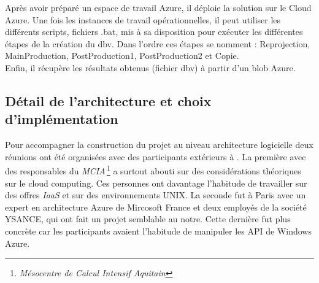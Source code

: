 Après avoir préparé un espace de travail Azure, il déploie la solution
sur le Cloud Azure. Une fois les instances de travail opérationnelles,
il peut utiliser les différents scripts, fichiers .bat, mis à sa
disposition pour exécuter les différentes étapes de la création du
dbv. Dans l'ordre ces étapes se nomment : Reprojection, MainProduction,
PostProduction1, PostProduction2 et Copie.\\

Enfin, il récupère les résultats obtenus (fichier dbv) à partir d'un
blob Azure.




























%
%


\subsection{Détail de l'architecture et choix d'implémentation}%
Pour accompagner la construction du projet au niveau architecture
logicielle deux réunions ont été organisées avec des participants
extérieurs à \maxsea. La première avec des responsables du
\textit{MCIA}\,\footnote{\textit{Mésocentre de Calcul Intensif
    Aquitain}} a surtout abouti sur des considérations théoriques sur
le cloud computing. Ces personnes ont davantage l'habitude de
travailler sur des offres \textit{IaaS} et sur des environnements
UNIX. La seconde fut à Paris avec un expert en architecture Azure de
Mircosoft France et deux employés de la société YSANCE, qui ont fait
un projet semblable au notre. Cette dernière fut plus concrète car les
participants avaient l'habitude de manipuler les API de Windows
Azure. \\




